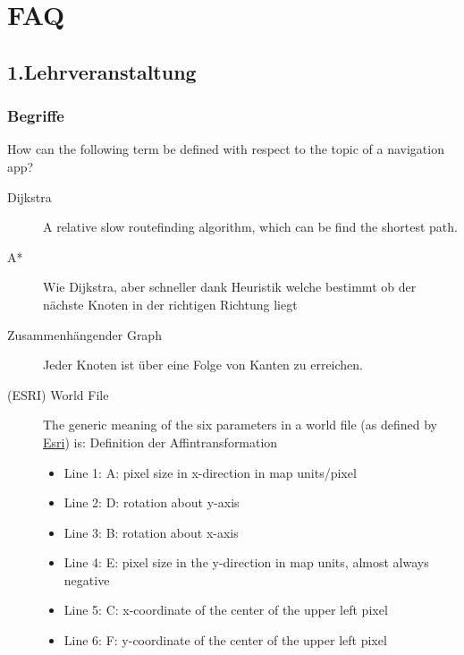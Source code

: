 \chapter{FAQ}
\label{ch:FAQ}

\section{1.Lehrveranstaltung}
\label{ch:FAQ:sec:1.Lehrveranstaltung}


\subsection{Begriffe}
How can the following term be defined with respect to the topic of a navigation app?

\begin{description}
    \item[Dijkstra] A relative slow routefinding algorithm, which can be find the shortest path.
    \item[A*] Wie Dijkstra, aber schneller dank Heuristik welche bestimmt ob der nächste Knoten in der richtigen
    Richtung liegt
    \item[Zusammenhängender Graph] Jeder Knoten ist über eine Folge von Kanten zu erreichen.
    \item[(ESRI) World File] The generic meaning of the six parameters in a world file
    (as defined by \href{https://www.esri.com/en-us/home}{Esri}\cite{ESRI}) is:
    Definition der Affintransformation

    \begin{itemize}
        \item Line 1: A: pixel size in x-direction in map units/pixel
        \item Line 2: D: rotation about y-axis
        \item Line 3: B: rotation about x-axis
        \item Line 4: E: pixel size in the y-direction in map units, almost always negative
        \item Line 5: C: x-coordinate of the center of the upper left pixel
        \item Line 6: F: y-coordinate of the center of the upper left pixel
    \end{itemize}


\end{description}
